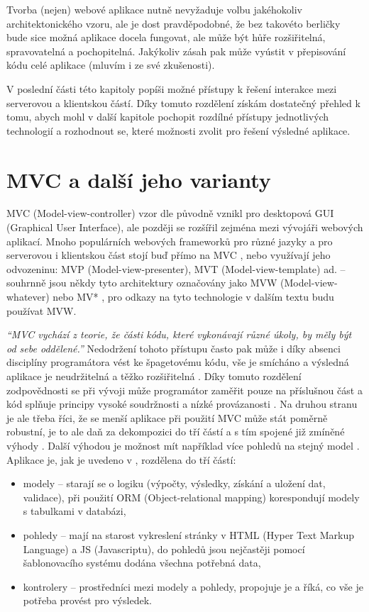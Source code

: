 Tvorba (nejen) webové aplikace nutně nevyžaduje volbu jakéhokoliv architektonického vzoru, ale je dost pravděpodobné, že bez takovéto berličky bude sice možná aplikace docela fungovat, ale může být hůře rozšiřitelná, spravovatelná a pochopitelná. Jakýkoliv zásah pak může vyústit v přepisování kódu celé aplikace (mluvím i ze své zkušenosti).

V poslední části této kapitoly popíši možné přístupy k řešení interakce mezi serverovou a klientskou částí. Díky tomuto rozdělení získám dostatečný přehled k tomu, abych mohl v další kapitole pochopit rozdílné přístupy jednotlivých technologií a rozhodnout se, které možnosti zvolit pro řešení výsledné aplikace.

    \section{MVC a další jeho varianty}\label{mvc}
    MVC (Model-view-controller) vzor dle \cite{mvc-cz1} původně vznikl pro desktopová GUI (Graphical User Interface), ale později se rozšířil zejména mezi vývojáři webových aplikací. Mnoho populárních webových frameworků pro různé jazyky a pro serverovou i klientskou část stojí buď přímo na MVC \cite{mvc-cz1}, nebo využívají jeho odvozeninu: MVP (Model-view-presenter), MVT (Model-view-template) ad. -- souhrnně jsou někdy tyto architektury označovány jako MVW (Model-view-whatever) nebo MV* \cite{mvw}, pro odkazy na tyto technologie v dalším textu budu používat MVW.
    
    \textit{\enquote{MVC vychází z teorie, že části kódu, které vykonávají různé úkoly, by měly být od sebe oddělené.}} \cite{mvc-cz2} Nedodržení tohoto přístupu často pak může i díky absenci disciplíny programátora vést ke špagetovému kódu, vše je smícháno a výsledná aplikace je neudržitelná a těžko rozšiřitelná \cite{mvc-cz2,mvc-2}. Díky tomuto rozdělení zodpovědnosti se při vývoji může programátor zaměřit pouze na příslušnou část a kód splňuje principy vysoké soudržnosti a nízké provázanosti \cite{mvc-medium1}. Na druhou stranu je ale třeba říci, že se menší aplikace při použití MVC může stát poměrně robustní, je to ale daň za dekompozici do tří částí a s tím spojené již zmíněné výhody \cite{mvc-medium1}. Další výhodou je možnost mít například více pohledů na stejný model \cite{mvc-1}. Aplikace je, jak je uvedeno v \cite{mvc-cz2}, rozdělena do tří částí:
    \begin{itemize}
        \item modely -- starají se o logiku (výpočty, výsledky, získání a uložení dat, validace), při použití ORM (Object-relational mapping) korespondují modely s tabulkami v databázi,
        \item pohledy -- mají na starost vykreslení stránky v HTML (Hyper Text Markup Language) a JS (Javascriptu), do pohledů jsou nejčastěji pomocí šablonovacího systému dodána všechna potřebná data,
        \item kontrolery -- prostředníci mezi modely a pohledy, propojuje je a říká, co vše je potřeba provést pro výsledek.
    \end{itemize}
    
